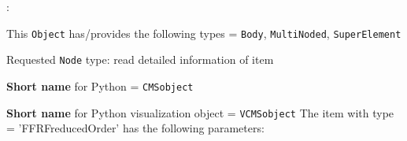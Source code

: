 \noindent {}:
\bi
  \item This \texttt{Object} has/provides the following types = \texttt{Body}, \texttt{MultiNoded}, \texttt{SuperElement}
  \item Requested \texttt{Node} type: read detailed information of item
  \item {\bf Short name} for Python = \texttt{CMSobject}
  \item {\bf Short name} for Python visualization object = \texttt{VCMSobject}
\ei\vspace{12pt} \noindent 
The item  with type = 'FFRFreducedOrder' has the following parameters:
\vspace{-0.5cm}\\
\vspace{-0.5cm}\\
